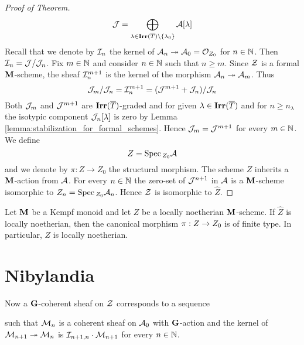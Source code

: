 \begin{proof}[Proof of Theorem]
$${\mathcal J}=\bigoplus_{\lambda \in \mathbf{Irr}(\overline{T})\setminus \{\lambda_0\}}{\mathcal A}[\lambda]$$
Recall that we denote by ${\mathcal I}_n$ the kernel of ${\mathcal A}_n\twoheadrightarrow {\mathcal A}_0={\mathcal O}_{Z_0}$ for $n\in {\mathbb N}$. Then ${\mathcal I}_n={\mathcal J}/{\mathcal J}_n$. Fix $m\in {\mathbb N}$ and consider $n\in {\mathbb N}$ such that $n\geq m$. Since ${\mathcal Z}$ is a formal $\mathbf{M}$-scheme, the sheaf ${\mathcal I}_n^{m+1}$ is the kernel of the morphism ${\mathcal A}_n\twoheadrightarrow {\mathcal A}_m$. Thus
$${\mathcal J}_m/{\mathcal J}_n={\mathcal I}_n^{m+1}=({\mathcal J}^{m+1}+{\mathcal J}_n)/{\mathcal J}_n$$
Both ${\mathcal J}_m$ and ${\mathcal J}^{m+1}$ are $\mathbf{Irr}(\overline{T})$-graded and for given $\lambda\in \mathbf{Irr}(\overline{T})$ and for $n \geq n_{\lambda}$ the isotypic component ${\mathcal J}_n[\lambda]$ is zero by Lemma \ref{lemma:stabilization_for_formal_schemes}. Hence ${\mathcal J}_m={\mathcal J}^{m+1}$ for every $m \in {\mathbb N}$.
We define
$$Z=\mathrm{Spec}\,_{Z_0}{\mathcal A}$$
and we denote by $\pi:Z\to Z_0$ the structural morphism. The scheme $Z$ inherits a $\mathbf{M}$-action from ${\mathcal A}$. For every $n\in {\mathbb N}$ the zero-set of ${\mathcal J}^{n+1}$ in ${\mathcal A}$ is a $\mathbf{M}$-scheme isomorphic to $Z_n = \mathrm{Spec}\,_{Z_0}{\mathcal A}_n$. Hence ${\mathcal Z}$ is isomorphic to $\widehat{Z}$.
\end{proof}

\begin{theorem}\label{theorem:locally_linear_with_locally_noetherian_formal_neighborhood_is_locally_noetherian}
Let $\mathbf{M}$ be a Kempf monoid and let $Z$ be a locally noetherian $\mathbf{M}$-scheme. If $\widehat{Z}$ is locally noetherian, then the canonical morphism $\pi:Z\rightarrow Z_0$ is of finite type. In particular, $Z$ is locally noetherian. 
\end{theorem}


\section{Nibylandia }
\noindent



Now a $\mathbf{G}$-coherent sheaf on ${\mathcal Z}$ corresponds to a sequence
\begin{center}
\end{center}
such that ${\mathcal M}_n$ is a coherent sheaf on ${\mathcal A}_0$ with $\mathbf{G}$-action and the kernel of ${\mathcal M}_{n+1}\twoheadrightarrow {\mathcal M}_n$ is ${\mathcal I}_{n+1,n}\cdot {\mathcal M}_{n+1}$ for every $n\in {\mathbb N}$.

